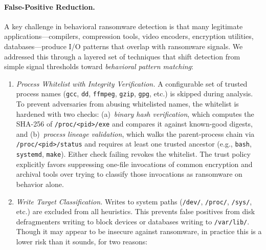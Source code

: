 \documentclass[twocolumn, 10pt]{scrartcl}
\begin{document}
\paragraph{False-Positive Reduction.}
A key challenge in behavioral ransomware detection is that many legitimate applications---compilers, compression tools, video encoders, encryption utilities, databases---produce I/O patterns that overlap with ransomware signals. 
We addressed this through a layered set of techniques that shift detection from simple signal thresholds toward \emph{behavioral pattern matching}:

\begin{enumerate}
    \item \textit{Process Whitelist with Integrity Verification.}
    A configurable set of trusted process names (\texttt{gcc}, \texttt{dd}, \texttt{ffmpeg}, \texttt{gzip}, \texttt{gpg}, etc.) is skipped during analysis. To prevent adversaries from abusing whitelisted names, the whitelist is hardened with two checks: (a)~\emph{binary hash verification}, which computes the SHA-256 of \texttt{/proc/<pid>/exe} and compares it against known-good digests, and (b)~\emph{process lineage validation}, which walks the parent-process chain via \texttt{/proc/<pid>/status} and requires at least one trusted ancestor (e.g., \texttt{bash}, \texttt{systemd}, \texttt{make}). Either check failing revokes the whitelist. The trust policy explicitly favors suppressing one-file invocations of common encryption and archival tools over trying to classify those invocations as ransomware on behavior alone.


    \item \textit{Write Target Classification.}
    Writes to system paths (\texttt{/dev/}, \texttt{/proc/}, \texttt{/sys/}, etc.) are excluded from all heuristics. This prevents false positives from disk defragmenters writing to block devices or databases writing to \texttt{/var/lib/}. Though it may appear to be insecure against ransomware, in practice this is a lower risk than it sounds, for two reasons:


\end{enumerate}
\end{document}
